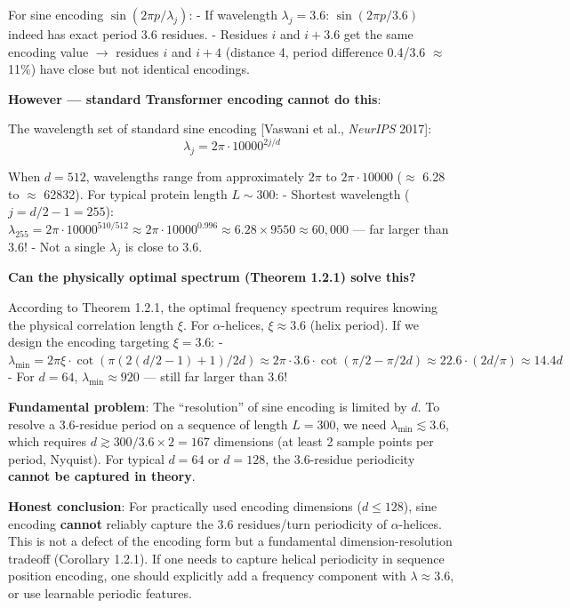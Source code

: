 \documentclass[
  12pt,
]{article}
\begin{document}
For sine encoding $\sin(2\pi p / \lambda_j)$:
- If wavelength $\lambda_j = 3.6$: $\sin(2\pi p/3.6)$ indeed has exact period 3.6 residues.
- Residues $i$ and $i+3.6$ get the same encoding value $\to$ residues $i$ and $i+4$ (distance 4, period difference 0.4/3.6 $\approx$ 11\%) have close but not identical encodings.

\textbf{However --- standard Transformer encoding cannot do this}:

The wavelength set of standard sine encoding [Vaswani et al., \emph{NeurIPS} 2017]:
\[\lambda_j = 2\pi \cdot 10000^{2j/d}\]

When $d = 512$, wavelengths range from approximately $2\pi$ to $2\pi \cdot 10000$ ($\approx$ 6.28 to $\approx$ 62832). For typical protein length $L \sim 300$:
- Shortest wavelength ($j = d/2-1 = 255$): $\lambda_{255} = 2\pi \cdot 10000^{510/512} \approx 2\pi \cdot 10000^{0.996} \approx 6.28 \times 9550 \approx 60,000$ --- far larger than 3.6!
- Not a single $\lambda_j$ is close to 3.6.

\textbf{Can the physically optimal spectrum (Theorem 1.2.1) solve this?}

According to Theorem 1.2.1, the optimal frequency spectrum requires knowing the physical correlation length $\xi$. For $\alpha$-helices, $\xi \approx 3.6$ (helix period). If we design the encoding targeting $\xi = 3.6$:
- $\lambda_{\min} = 2\pi\xi \cdot \cot(\pi(2(d/2-1)+1)/2d) \approx 2\pi \cdot 3.6 \cdot \cot(\pi/2 - \pi/2d) \approx 22.6 \cdot (2d/\pi) \approx 14.4 d$
- For $d = 64$, $\lambda_{\min} \approx 920$ --- still far larger than 3.6!

\textbf{Fundamental problem}: The ``resolution'' of sine encoding is limited by $d$. To resolve a 3.6-residue period on a sequence of length $L = 300$, we need $\lambda_{\min} \lesssim 3.6$, which requires $d \gtrsim 300/3.6 \times 2 = 167$ dimensions (at least 2 sample points per period, Nyquist). For typical $d = 64$ or $d = 128$, the 3.6-residue periodicity \textbf{cannot be captured in theory}.

\textbf{Honest conclusion}: For practically used encoding dimensions ($d \leq 128$), sine encoding \textbf{cannot} reliably capture the 3.6 residues/turn periodicity of $\alpha$-helices. This is not a defect of the encoding form but a fundamental dimension-resolution tradeoff (Corollary 1.2.1). If one needs to capture helical periodicity in sequence position encoding, one should explicitly add a frequency component with $\lambda \approx 3.6$, or use learnable periodic features.
\end{document}
